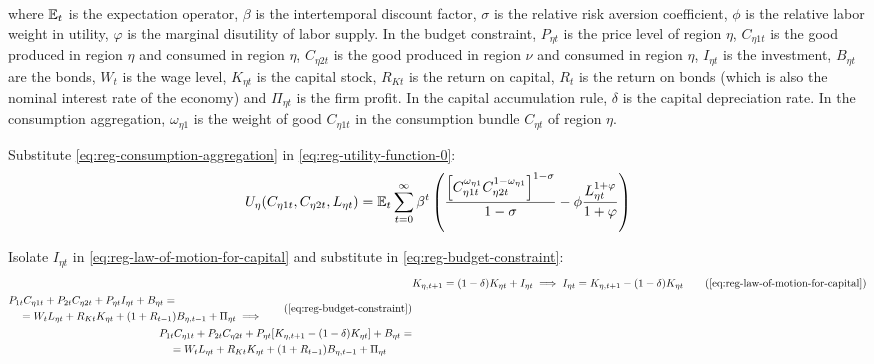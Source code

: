 \documentclass[
thesis.tex
]{subfiles}
\begin{document}
where ${\mathbb{E}_{t}}$ is the expectation operator, $\beta$ is the intertemporal discount factor, $\sigma$ is the relative risk aversion coefficient, $\phi$ is the relative labor weight in utility, $\varphi$ is the marginal disutility of labor supply. In the budget constraint, $P_{\eta t}$ is the price level of region $\eta$, $C_{\eta 1 t}$ is the good produced in region $\eta$ and consumed in region $\eta$, $C_{\eta 2 t}$ is the good produced in region $\nu$ and consumed in region $\eta$, $I_{\eta t}$ is the investment, $B_{\eta t}$ are the bonds, $W_t$ is the wage level, $K_{\eta t}$ is the capital stock, $R_{Kt}$ is the return on capital, $R_t$ is the return on bonds (which is also the nominal interest rate of the economy) and $\Pi_{\eta t}$ is the firm profit. In the capital accumulation rule, $\delta$ is the capital depreciation rate. In the consumption aggregation, ${\omega_{\eta 1}}$ is the weight of good $C_{\eta 1 t}$ in the consumption bundle $C_{\eta t}$ of region $\eta$.

Substitute \ref{eq:reg-consumption-aggregation} in \ref{eq:reg-utility-function-0}:
\begin{align}
	U_{\eta}(C_{\eta 1 t}, C_{\eta 2 t}, L_{\eta t}) = {\mathbb{E}_{t}} \sum_{t=0}^{\infty} \beta^t \left( \frac{\left[ C_{\eta 1 t}^{\omega_{\eta 1}} C_{\eta 2 t}^{1-\omega_{\eta 1}} \right]^{1-\sigma}}{1-\sigma} - \phi \frac{L_{\eta t}^{1+\varphi}}{1+\varphi} \right) \label{eq:reg-utility-function}
\end{align}

Isolate $I_{\eta t}$ in \ref{eq:reg-law-of-motion-for-capital} and substitute in \ref{eq:reg-budget-constraint}:
\begin{align}
	& K_{\eta, t+1} = (1-\delta)K_{\eta t} + I_{\eta t} \implies I_{\eta t} = K_{\eta, t+1} - (1-\delta)K_{\eta t} \tag{\ref{eq:reg-law-of-motion-for-capital}} \\
	\begin{split}
		& P_{1 t} C_{\eta 1 t} + P_{2 t} C_{\eta 2 t} + P_{\eta t} I_{\eta t} + B_{\eta t} = \\ & \quad = W_t L_{\eta t} + R_{Kt} K_{\eta t} + (1 + R_{t-1}) B_{\eta,t-1} + \Pi_{\eta t} \implies
	\end{split} \tag{\ref{eq:reg-budget-constraint}}
	\\
	\begin{split}
		& P_{1 t} C_{\eta 1 t} + P_{2 t} C_{\eta 2 t} + P_{\eta t} [ K_{\eta, t+1} - (1-\delta)K_{\eta t} ] + B_{\eta t} = \\ & \quad = W_t L_{\eta t} + R_{Kt} K_{\eta t} + (1 + R_{t-1}) B_{\eta,t-1} + \Pi_{\eta t}
	\end{split} \label{eq:reg-budget-constraint-2}
\end{align}
\end{document}
